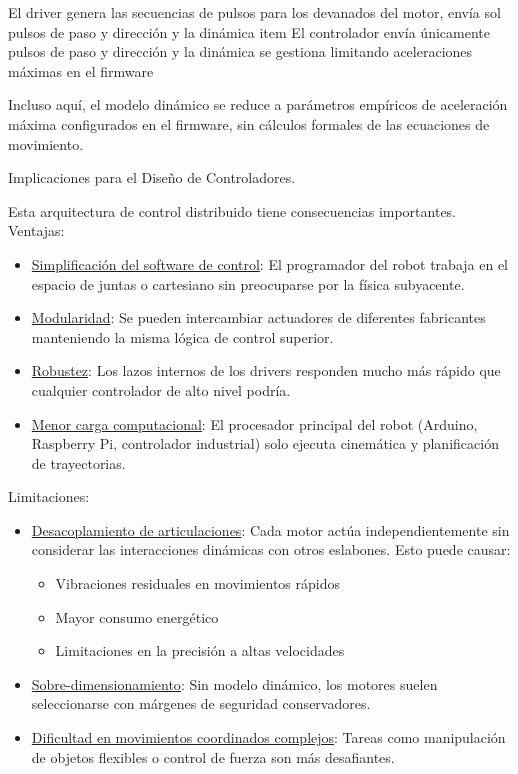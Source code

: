 El driver genera las secuencias de pulsos para los devanados del motor, envía sol pulsos de paso y dirección y la dinámica item El controlador envía únicamente pulsos de paso y dirección y la dinámica se gestiona limitando aceleraciones máximas en el firmware

Incluso aquí, el modelo dinámico se reduce a parámetros empíricos de aceleración máxima configurados en el firmware, sin cálculos formales de las ecuaciones de movimiento.

Implicaciones para el Diseño de Controladores.

Esta arquitectura de control distribuido tiene consecuencias importantes.\\

Ventajas:

\begin{itemize}[label=$\bullet$]
    \item \underline{Simplificación del software de control}: El programador del robot trabaja en el espacio de juntas o cartesiano sin preocuparse por la física subyacente.

    \item \underline{Modularidad}: Se pueden intercambiar actuadores de diferentes fabricantes manteniendo la misma lógica de control superior.

    \item \underline{Robustez}: Los lazos internos de los drivers responden mucho más rápido que cualquier controlador de alto nivel podría.

    \item \underline{Menor carga computacional}: El procesador principal del robot (Arduino, Raspberry Pi, controlador industrial) solo ejecuta cinemática y planificación de trayectorias.
\end{itemize}

Limitaciones:

\begin{itemize}[label=$\bullet$]
    \item \underline{Desacoplamiento de articulaciones}: Cada motor actúa independientemente sin considerar las interacciones dinámicas con otros eslabones. Esto puede causar:
    \begin{itemize}[label=$\bullet$]
        \item Vibraciones residuales en movimientos rápidos
        \item Mayor consumo energético
        \item Limitaciones en la precisión a altas velocidades
    \end{itemize}

    \item \underline{Sobre-dimensionamiento}: Sin modelo dinámico, los motores suelen seleccionarse con márgenes de seguridad conservadores.

    \item \underline{Dificultad en movimientos coordinados complejos}: Tareas como manipulación de objetos flexibles o control de fuerza son más desafiantes.
\end{itemize}

